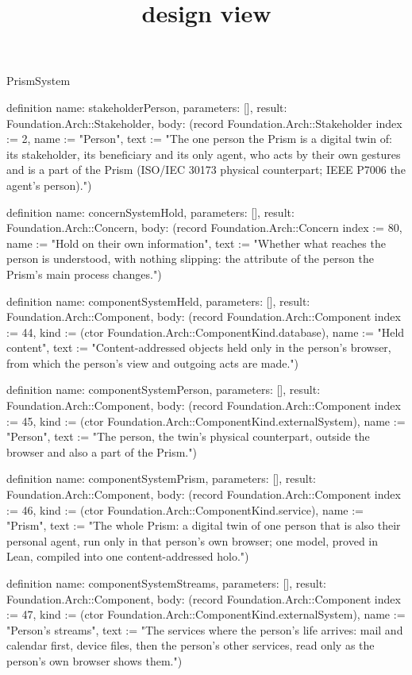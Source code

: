 \begin{lexlean}{PrismSystem}
\title{design view}
\begin{semanticmodule}
definition{
  name: stakeholderPerson,
  parameters: [],
  result: Foundation.Arch::Stakeholder,
  body: (record Foundation.Arch::Stakeholder {index := 2, name := "Person", text := "The one person the Prism is a digital twin of: its stakeholder, its beneficiary and its only agent, who acts by their own gestures and is a part of the Prism (ISO/IEC 30173 physical counterpart; IEEE P7006 the agent's person)."})
}

definition{
  name: concernSystemHold,
  parameters: [],
  result: Foundation.Arch::Concern,
  body: (record Foundation.Arch::Concern {index := 80, name := "Hold on their own information", text := "Whether what reaches the person is understood, with nothing slipping: the attribute of the person the Prism's main process changes."})
}

definition{
  name: componentSystemHeld,
  parameters: [],
  result: Foundation.Arch::Component,
  body: (record Foundation.Arch::Component {index := 44, kind := (ctor Foundation.Arch::ComponentKind.database), name := "Held content", text := "Content-addressed objects held only in the person's browser, from which the person's view and outgoing acts are made."})
}

definition{
  name: componentSystemPerson,
  parameters: [],
  result: Foundation.Arch::Component,
  body: (record Foundation.Arch::Component {index := 45, kind := (ctor Foundation.Arch::ComponentKind.externalSystem), name := "Person", text := "The person, the twin's physical counterpart, outside the browser and also a part of the Prism."})
}

definition{
  name: componentSystemPrism,
  parameters: [],
  result: Foundation.Arch::Component,
  body: (record Foundation.Arch::Component {index := 46, kind := (ctor Foundation.Arch::ComponentKind.service), name := "Prism", text := "The whole Prism: a digital twin of one person that is also their personal agent, run only in that person's own browser; one model, proved in Lean, compiled into one content-addressed holo."})
}

definition{
  name: componentSystemStreams,
  parameters: [],
  result: Foundation.Arch::Component,
  body: (record Foundation.Arch::Component {index := 47, kind := (ctor Foundation.Arch::ComponentKind.externalSystem), name := "Person's streams", text := "The services where the person's life arrives: mail and calendar first, device files, then the person's other services, read only as the person's own browser shows them."})
}


\end{semanticmodule}
\end{lexlean}
